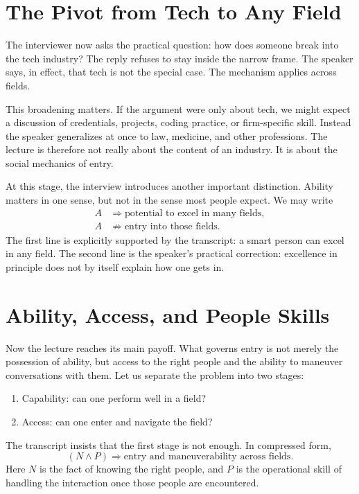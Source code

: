 \section{The Pivot from Tech to Any Field}

The interviewer now asks the practical question: how does someone break into the tech industry? The reply refuses to stay inside the narrow frame. The speaker says, in effect, that tech is not the special case. The mechanism applies across fields.

This broadening matters. If the argument were only about tech, we might expect a discussion of credentials, projects, coding practice, or firm-specific skill. Instead the speaker generalizes at once to law, medicine, and other professions. The lecture is therefore not really about the content of an industry. It is about the social mechanics of entry.

At this stage, the interview introduces another important distinction. Ability matters in one sense, but not in the sense most people expect. We may write
\begin{align}
A &\Longrightarrow \text{potential to excel in many fields},\\
A &\not\Longrightarrow \text{entry into those fields}.
\end{align}
The first line is explicitly supported by the transcript: a smart person can excel in any field. The second line is the speaker's practical correction: excellence in principle does not by itself explain how one gets in.

\section{Ability, Access, and People Skills}

Now the lecture reaches its main payoff. What governs entry is not merely the possession of ability, but access to the right people and the ability to maneuver conversations with them. Let us separate the problem into two stages:
\begin{enumerate}
\item Capability: can one perform well in a field?
\item Access: can one enter and navigate the field?
\end{enumerate}

The transcript insists that the first stage is not enough. In compressed form,
\begin{equation}
(N \land P) \Longrightarrow \text{entry and maneuverability across fields.}
\end{equation}
Here \(N\) is the fact of knowing the right people, and \(P\) is the operational skill of handling the interaction once those people are encountered.


